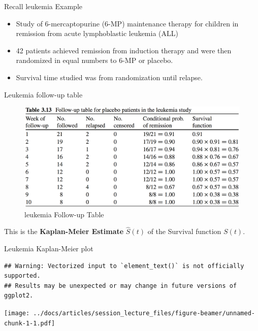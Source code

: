\documentclass[
  ignorenonframetext,
]{beamer}
\providecommand{\tightlist}{%
  \setlength{\itemsep}{0pt}\setlength{\parskip}{0pt}}
\begin{document}
\begin{frame}{Recall leukemia Example}
\protect\hypertarget{recall-leukemia-example}{}

\begin{itemize}
\tightlist
\item
  Study of 6-mercaptopurine (6-MP) maintenance therapy for children in
  remission from acute lymphoblastic leukemia (ALL)
\item
  42 patients achieved remission from induction therapy and were then
  randomized in equal numbers to 6-MP or placebo.
\item
  Survival time studied was from randomization until relapse.
\end{itemize}

\end{frame}

\begin{frame}{Leukemia follow-up table}
\protect\hypertarget{leukemia-follow-up-table}{}

\begin{figure}
\centering
\includegraphics{figures/leukemiatable.png}
\caption{leukemia Follow-up Table}
\end{figure}

This is the \textbf{Kaplan-Meier Estimate} \(\hat S(t)\) of the Survival
function \(S(t)\).

\end{frame}

\begin{frame}[fragile]{Leukemia Kaplan-Meier plot}
\protect\hypertarget{leukemia-kaplan-meier-plot}{}

\begin{verbatim}
## Warning: Vectorized input to `element_text()` is not officially supported.
## Results may be unexpected or may change in future versions of ggplot2.
\end{verbatim}

\texttt{[image: ../docs/articles/session\_lecture\_files/figure-beamer/unnamed-chunk-1-1.pdf]}

\end{frame}
\end{document}
